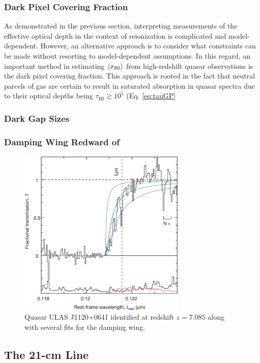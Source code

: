 \subsubsection{Dark Pixel Covering Fraction}

As demonstrated in the previous section, interpreting measurements of the effective optical depth in the context of reionization is complicated and model-dependent. However, an alternative approach is to consider what constraints can be made without resorting to model-dependent assumptions. In this regard, an important method in estimating $\langle x_{\text{HI}}\rangle$ from high-redshift quasar observations is the dark pixel covering fraction. This approach is rooted in the fact that neutral parcels of gas are certain to result in saturated absorption in quasar spectra due to their optical depths being $\tau_{\text{HI}} \gtrsim 10^5$ (Eq. \ref{eq:tauGP}


\subsubsection{Dark Gap Sizes}
\subsubsection{Damping Wing Redward of \lya}

\begin{figure}[h]
  \centering
  \includegraphics[width=8cm]{z7p085_DampingWing.eps}
  \caption{Quasar ULAS J1120+0641 identified at redshift $z = 7.085$ along with several fits for the damping wing.}
  \label{fig:Chornock}
\end{figure}



\subsection{The 21-cm Line}

